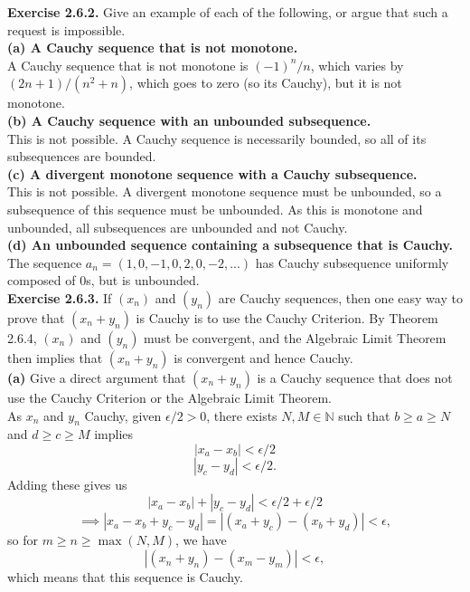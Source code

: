 \documentclass[12pt,letterpaper]{article}
\begin{document}
\textbf{Exercise 2.6.2.} Give an example of each of the following, or argue that such a request is impossible. \\

\textbf{(a) A Cauchy sequence that is not monotone.} \\

A Cauchy sequence that is not monotone is \((-1)^{n}/n\), which varies by \((2n+1)/(n^{2}+n)\), which goes to zero (so its Cauchy), but it is not monotone. \\

\textbf{(b) A Cauchy sequence with an unbounded subsequence.} \\

This is not possible. A Cauchy sequence is necessarily bounded, so all of its subsequences are bounded. \\

\textbf{(c) A divergent monotone sequence with a Cauchy subsequence.} \\

This is not possible. A divergent monotone sequence must be unbounded, so a subsequence of this sequence must be unbounded. As this is monotone and unbounded, all subsequences are unbounded and not Cauchy. \\

\textbf{(d) An unbounded sequence containing a subsequence that is Cauchy.} \\

The sequence \(a_{n} = (1,0,-1,0,2,0,-2,...)\) has Cauchy subsequence uniformly composed of 0s, but is unbounded. \\

\textbf{Exercise 2.6.3.} If \((x_{n})\) and \((y_{n})\) are Cauchy sequences, then one easy way to prove that \((x_{n}+y_{n})\) is Cauchy is to use the Cauchy Criterion. By Theorem 2.6.4, \((x_{n})\) and \((y_{n})\) must be convergent, and the Algebraic Limit Theorem then implies that \((x_{n} + y_{n})\) is convergent and hence Cauchy. \\

\textbf{(a)} Give a direct argument that \((x_{n} + y_{n})\) is a Cauchy sequence that does not use the Cauchy Criterion or the Algebraic Limit Theorem. \\

As \(x_{n}\) and \(y_{n}\) Cauchy, given \(\epsilon/2 > 0\), there exists \(N,M \in \mathbb{N}\) such that \(b \geq a \geq N\) and \(d \geq c \geq M\) implies \[|x_{a}-x_{b}| < \epsilon/2\]\[|y_{c} - y_{d}| < \epsilon/2.\] Adding these gives us \[|x_{a} - x_{b}| + |y_{c} - y_{d}| < \epsilon/2+\epsilon/2\] \[\implies |x_{a} - x_{b} + y_{c} - y_{d}| = |(x_{a} + y_{c}) - (x_{b} + y_{d})|  < \epsilon,\] so for \(m \geq n \geq \max(N,M)\), we have \[|(x_{n} + y_{n}) - (x_{m} - y_{m})| < \epsilon,\] which means that this sequence is Cauchy. \\
\end{document}
